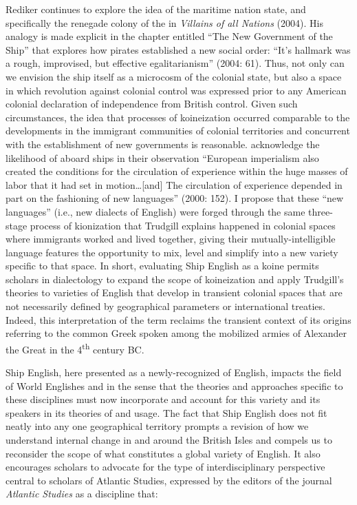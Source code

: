 Rediker continues to explore the idea of the maritime nation state, and specifically the renegade colony of the  in \textit{Villains of all Nations} (2004). His analogy is made explicit in the chapter entitled “The New Government of the Ship” that explores how pirates established a new social order: “It’s hallmark was a rough, improvised, but effective egalitarianism” (2004: 61). Thus, not only can we envision the ship itself as a microcosm of the colonial state, but also a space in which revolution against colonial control was expressed prior to any American colonial declaration of independence from British control. Given such circumstances, the idea that processes of koineization occurred comparable to the developments in the immigrant communities of colonial territories and concurrent with the establishment of new governments is reasonable. \citeauthor{LinebaughRediker2000} acknowledge the likelihood of  aboard ships in their observation “European imperialism also created the conditions for the circulation of experience within the huge masses of labor that it had set in motion…[and] The circulation of experience depended in part on the fashioning of new languages” (2000: 152). I propose that these “new languages” (i.e., new dialects of English) were forged through the same three-stage process of kionization that Trudgill explains happened in colonial spaces where immigrants worked and lived together, giving their mutually-intelligible language features the opportunity to mix, level and simplify into a new variety specific to that space. In short, evaluating Ship English as a koine permits scholars in dialectology to expand the scope of koineization and apply Trudgill’s theories to varieties of English that develop in transient colonial spaces that are not necessarily defined by geographical parameters or international treaties. Indeed, this interpretation of the term reclaims the transient context of its origins referring to the common Greek  spoken among the mobilized armies of Alexander the Great in the 4\textsuperscript{th} century BC. 

Ship English, here presented as a newly-recognized  of English, impacts the field of World Englishes and  in the sense that the theories and approaches specific to these disciplines must now incorporate and account for this variety and its speakers in its theories of  and usage. The fact that Ship English does not fit neatly into any one geographical territory prompts a revision of how we understand internal  change in and around the British Isles and compels us to reconsider the scope of what constitutes a global variety of English. It also encourages scholars to advocate for the type of interdisciplinary perspective central to scholars of Atlantic Studies, expressed by the editors of the journal \textit{Atlantic Studies} as a discipline that:


